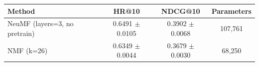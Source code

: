 \begin{tabular}{lccc}
\toprule
Method & HR@10 & NDCG@10 & Parameters \\
\midrule
NeuMF (layers=3, no pretrain) & 0.6491 $\pm$ 0.0105 & 0.3902 $\pm$ 0.0068 & 107,761 \\
NMF (k=26) & 0.6349 $\pm$ 0.0044 & 0.3679 $\pm$ 0.0030 & 68,250 \\
\bottomrule
\end{tabular}